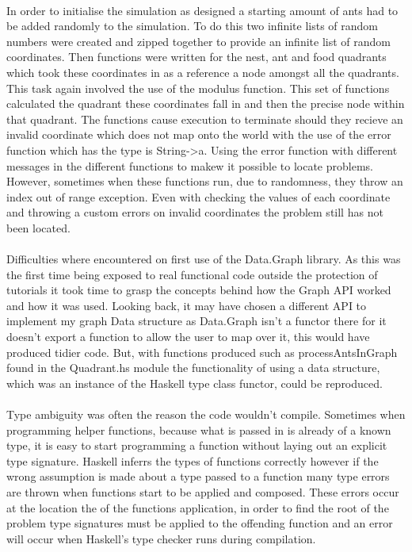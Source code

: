 \documentclass[main.tex]{subfiles}
\begin{document}
\paragraph{}In order to initialise the simulation as designed a starting amount of ants had to be added randomly to the simulation. To do this two infinite lists of random numbers were created and zipped together to provide an infinite list of random coordinates. Then functions were written for the nest, ant and food quadrants which took these coordinates in as a reference a node amongst all the quadrants. This task again involved the use of the modulus function. This set of functions calculated the quadrant these coordinates fall in and then the precise node within that quadrant. The functions cause execution to terminate should they recieve an invalid coordinate which does not map onto the world with the use of the error function which has the type is String->a. Using the error function with different messages in the different functions to makew it possible to locate problems. However, sometimes when these functions run, due to randomness, they throw an index out of range exception. Even with checking the values of each coordinate and throwing a custom errors on invalid coordinates the problem still has not been located.

\paragraph{} Difficulties where encountered on first use of the Data.Graph library. As this was the first time being exposed to real functional code outside the protection of tutorials it took time to grasp the concepts behind how the Graph API worked and how it was used. Looking back, it may have chosen a different API to implement my graph Data structure as Data.Graph isn't a functor there for it doesn't export a function to allow the user to map over it, this would have produced tidier code. But, with functions produced such as processAntsInGraph found in the Quadrant.hs module the functionality of using a data structure, which was an instance of the Haskell type class functor, could be reproduced.

\paragraph{}Type ambiguity was often the reason the code wouldn't compile. Sometimes when programming helper functions, because what is passed in is already of a known type, it is easy to start programming a function without laying out an explicit type signature. Haskell inferrs the types of functions correctly however if the wrong assumption is made about a type passed to a function many type errors are thrown when functions start to be applied and composed. These errors occur at the location the of the functions application, in order to find the root of the problem type signatures must be applied to the offending function and an error will occur when Haskell's type checker runs during compilation.
\end{document}
